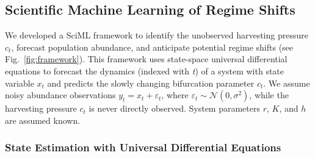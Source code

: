 \documentclass[openacc]{rsproca_new}%
\newcommand{\bs}[1]{\boldsymbol{#1}}
\begin{document}






\subsection{Scientific Machine Learning of Regime Shifts}
\label{sec:sciml}

We developed a SciML framework to identify the unobserved harvesting pressure $c_t$, forecast population abundance, and anticipate potential regime shifts (see Fig.~\ref{fig:framework}).
This framework uses state-space universal differential equations to forecast the dynamics (indexed with \textit{t}) of a system with state variable $x_t$ and predicts the slowly changing bifurcation parameter $c_t$. We assume noisy abundance observations $y_t = x_t + \varepsilon_t$, where $\varepsilon_t \sim \mathcal{N}(0,\sigma^2)$, while the harvesting pressure $c_t$ is never directly observed. System parameters $r$, $K$, and $h$ are assumed known.

\subsubsection*{State Estimation with Universal Differential Equations}
\end{document}
